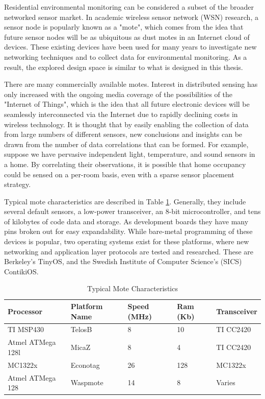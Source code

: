 Residential environmental monitoring can be considered a subset of the broader networked sensor market. In academic wireless sensor network (WSN) research, a sensor node is popularly known as a "mote", which comes from the idea that future sensor nodes will be as ubiquitous as dust motes in an Internet cloud of devices. These existing devices have been used for many years to investigate new networking techniques and to collect data for environmental monitoring. As a result, the explored design space is similar to what is designed in this thesis. 

There are many commercially available motes. Interest in distributed sensing has only increased with the ongoing media coverage of the possibilities of the "Internet of Things", which is the idea that all future electronic devices will be seamlessly interconnected via the Internet due to rapidly declining costs in wireless technology. It is thought that by easily enabling the collection of data from large numbers of different sensors, new conclusions and insights can be drawn from the number of data correlations that can be formed. For example, suppose we have pervasive independent light, temperature, and sound sensors in a home. By correlating their observations, it is possible that home occupancy could be sensed on a per-room basis, even with a sparse sensor placement strategy.

Typical mote characteristics are described in Table \ref{mote_characteristics}. Generally, they include several default sensors, a low-power transceiver, an 8-bit microcontroller, and tens of kilobytes of code data and storage. As development boards they have many pins broken out for easy expandability. While bare-metal programming of these devices is popular, two operating systems exist for these platforms, where new networking and application layer protocols are tested and researched. These are Berkeley's TinyOS\cite{Levis2005}, and the Swedish Institute of Computer Science's (SICS) ContikiOS\cite{Dunkels2011}. 

\begin{table}[h]
\begin{tabular}{@{}lllll@{}}
\toprule
Processor & Platform Name & Speed (MHz) & Ram (Kb) & Transceiver \\ \midrule
TI MSP430 & TelosB & 8 & 10 & TI CC2420 \\
Atmel ATMega 128l & MicaZ & 8 & 4 & TI CC2420 \\
MC1322x & Econotag & 26 & 128 & MC1322x \\
Atmel ATMega 128 & Waspmote & 14 & 8 & Varies \\ \bottomrule
\end{tabular}
\caption{Typical Mote Characteristics}
\label{mote_characteristics}
\end{table}

